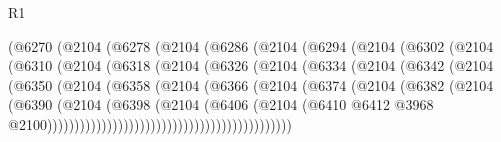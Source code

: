 \begin{lexlean}{R1}
\begin{coremodule}
                    (@6270
                      (@2104
                        (@6278
                          (@2104
                            (@6286
                              (@2104
                                (@6294
                                  (@2104
                                    (@6302
                                      (@2104
                                        (@6310
                                          (@2104
                                            (@6318
                                              (@2104
                                                (@6326
                                                  (@2104
                                                    (@6334
                                                      (@2104
                                                        (@6342
                                                          (@2104
                                                            (@6350
                                                              (@2104
                                                                (@6358
                                                                  (@2104
                                                                    (@6366
                                                                      (@2104
                                                                        (@6374
                                                                          (@2104
                                                                            (@6382
                                                                              (@2104
                                                                                (@6390
                                                                                  (@2104
                                                                                    (@6398
                                                                                      (@2104
                                                                                        (@6406
                                                                                          (@2104
                                                                                            (@6410
                                                                                              @6412
                                                                                              @3968
                                                                                              @2100)))))))))))))))))))))))))))))))))))))))))))))

\end{coremodule}
\end{lexlean}
